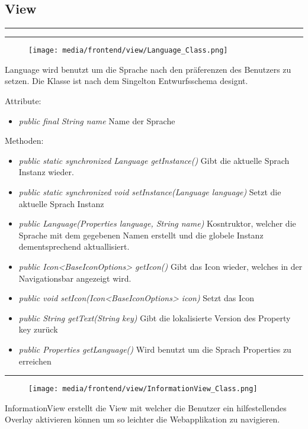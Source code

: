 \subsection{View}



\rule{\textwidth}{0.4pt} 

\rule{\textwidth}{0.4pt} 
\begin{minipage}{0.3\textwidth}
    \begin{figure}[H]
        \texttt{[image: media/frontend/view/Language\_Class.png]}
    \end{figure}
    \end{minipage} \hfill
    \begin{minipage}{0.6\textwidth}
    Language wird benutzt um die Sprache nach den präferenzen des Benutzers zu setzen. Die Klasse ist nach dem Singelton Entwurfsschema designt.
    \end{minipage}

Attribute:
\begin{itemize} 
    \item \emph{public final String name} Name der Sprache
\end{itemize}
Methoden:
\begin{itemize} 
    \item \emph{public static synchronized Language getInstance()} Gibt die aktuelle Sprach Instanz wieder.
    \item \emph{public static synchronized void setInstance(Language language)} Setzt die aktuelle Sprach Instanz
    \item \emph{public Language(Properties language, String name)} Kosntruktor, welcher die Sprache mit dem gegebenen Namen erstellt und die globele Instanz dementsprechend aktuallisiert.
    \item \emph{public Icon<BaseIconOptions> getIcon()} Gibt das Icon wieder, welches in der Navigationsbar angezeigt wird.
    \item \emph{public void setIcon(Icon<BaseIconOptions> icon)} Setzt das Icon
    \item \emph{public String getText(String key)} Gibt die lokalisierte Version des Property key zurück
    \item \emph{public Properties getLanguage()} Wird benutzt um die Sprach Properties zu erreichen
\end{itemize}

\rule{\textwidth}{0.4pt} 
\begin{minipage}{0.3\textwidth}
    \begin{figure}[H]
        \texttt{[image: media/frontend/view/InformationView\_Class.png]}
    \end{figure}
    \end{minipage} \hfill
    \begin{minipage}{0.6\textwidth}
InformationView erstellt die View mit welcher die Benutzer ein hilfestellendes Overlay aktivieren können um so leichter 
die Webapplikation zu navigieren.
\end{minipage}


